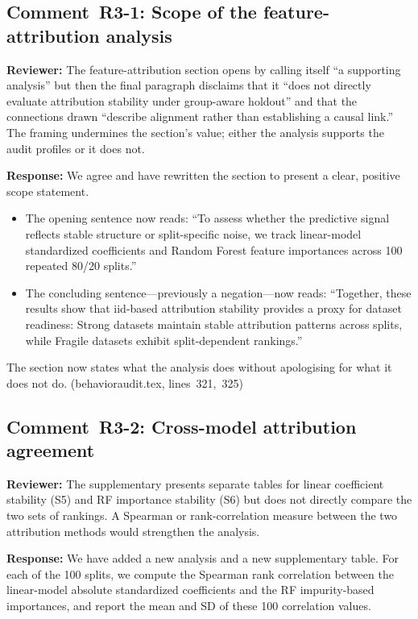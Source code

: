 \documentclass[10pt,letterpaper]{article}
\begin{document}
\subsection*{Comment~R3-1: Scope of the feature-attribution analysis}

\textbf{Reviewer:} The feature-attribution section opens by calling itself
``a supporting analysis'' but then the final paragraph disclaims that it
``does not directly evaluate attribution stability under group-aware
holdout'' and that the connections drawn ``describe alignment rather than
establishing a causal link.''  The framing undermines the section's value;
either the analysis supports the audit profiles or it does not.

\textbf{Response:} We agree and have rewritten the section to present a
clear, positive scope statement.

\begin{itemize}
\item The opening sentence now reads: ``To assess whether the
  predictive signal reflects stable structure or split-specific noise,
  we track linear-model standardized coefficients and Random Forest
  feature importances across 100 repeated 80/20 splits.''
\item The concluding sentence---previously a negation---now reads:
  ``Together, these results show that iid-based attribution stability
  provides a proxy for dataset readiness: Strong datasets maintain
  stable attribution patterns across splits, while Fragile datasets
  exhibit split-dependent rankings.''
\end{itemize}

The section now states what the analysis does without apologising for
what it does not do.  (behavioraudit.tex, lines~321,~325)

\subsection*{Comment~R3-2: Cross-model attribution agreement}

\textbf{Reviewer:} The supplementary presents separate tables for linear
coefficient stability (S5) and RF importance stability (S6) but does not
directly compare the two sets of rankings.  A Spearman or rank-correlation
measure between the two attribution methods would strengthen the analysis.

\textbf{Response:} We have added a new analysis and a new supplementary
table.  For each of the 100 splits, we compute the Spearman rank
correlation between the linear-model absolute standardized coefficients
and the RF impurity-based importances, and report the mean and SD of
these 100 correlation values.
\end{document}
